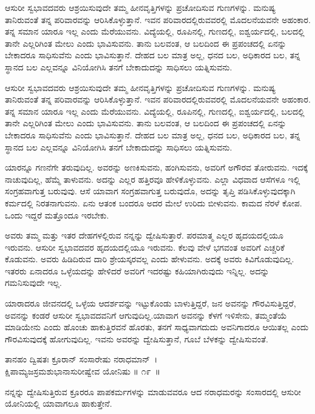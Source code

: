 ಆಸುರೀ ಸ್ವಭಾವದವರು ಆಶ್ರಯಿಸುವುದೇ ತಮ್ಮ ಹೀನವೃತ್ತಿಗಳನ್ನು ಪ್ರಚೋದಿಸುವ ಗುಣಗಳನ್ನು. ಮನುಷ್ಯ ತಾನಿರುವಂತೆ ತನ್ನ ಪರಿವಾರವನ್ನು ಆರಿಸಿಕೊಳ್ಳುತ್ತಾನೆ. ಇವನ ಪರಿವಾರ\-ದಲ್ಲಿರುವವರಲ್ಲಿ ಮೊದಲನೆಯವನೇ ಅಹಂಕಾರ. ತನ್ನ ಸಮಾನ ಯಾರೂ ಇಲ್ಲ ಎಂದು ಮೆರೆಯುವನು. ವಿದ್ಯೆಯಲ್ಲಿ, ರೂಪಿನಲ್ಲಿ, ಗುಣದಲ್ಲಿ, ಐಶ್ವರ್ಯದಲ್ಲಿ, ಬಲದಲ್ಲಿ ತಾನೇ ಎಲ್ಲರಿಗಿಂತ ಮೇಲು ಎಂದು ಭಾವಿಸುವನು. ತಾನು ಬಲವಂತ, ಆ ಬಲದಿಂದ ಈ ಪ್ರಪಂಚದಲ್ಲಿ ಏನನ್ನು ಬೇಕಾದರೂ ಸಾಧಿಸುವೆನು ಎಂದು ಭಾವಿಸುತ್ತಾನೆ. ದೇಹದ ಬಲ ಮಾತ್ರ ಅಲ್ಲ, ಧನದ ಬಲ, ಅಧಿಕಾರದ ಬಲ, ತನ್ನ ಸ್ಥಾನದ ಬಲ ಎಲ್ಲವನ್ನೂ ವಿನಿಯೋಗಿಸಿ ತನಗೆ ಬೇಕಾದುದನ್ನು ಸಾಧಿಸಲು ಯತ್ನಿಸುವನು.

ಆಸುರೀ ಸ್ವಭಾವದವರು ಆಶ್ರಯಿಸುವುದೇ ತಮ್ಮ ಹೀನವೃತ್ತಿಗಳನ್ನು ಪ್ರಚೋದಿಸುವ ಗುಣಗಳನ್ನು. ಮನುಷ್ಯ ತಾನಿರುವಂತೆ ತನ್ನ ಪರಿವಾರವನ್ನು ಆರಿಸಿಕೊಳ್ಳುತ್ತಾನೆ. ಇವನ ಪರಿವಾರ\-ದಲ್ಲಿರುವವರಲ್ಲಿ ಮೊದಲನೆಯವನೇ ಅಹಂಕಾರ. ತನ್ನ ಸಮಾನ ಯಾರೂ ಇಲ್ಲ ಎಂದು ಮೆರೆಯುವನು. ವಿದ್ಯೆಯಲ್ಲಿ, ರೂಪಿನಲ್ಲಿ, ಗುಣದಲ್ಲಿ, ಐಶ್ವರ್ಯದಲ್ಲಿ, ಬಲದಲ್ಲಿ ತಾನೇ ಎಲ್ಲರಿಗಿಂತ ಮೇಲು ಎಂದು ಭಾವಿಸುವನು. ತಾನು ಬಲವಂತ, ಆ ಬಲದಿಂದ ಈ ಪ್ರಪಂಚದಲ್ಲಿ ಏನನ್ನು ಬೇಕಾದರೂ ಸಾಧಿಸುವೆನು ಎಂದು ಭಾವಿಸುತ್ತಾನೆ. ದೇಹದ ಬಲ ಮಾತ್ರ ಅಲ್ಲ, ಧನದ ಬಲ, ಅಧಿಕಾರದ ಬಲ, ತನ್ನ ಸ್ಥಾನದ ಬಲ ಎಲ್ಲವನ್ನೂ ವಿನಿಯೋಗಿಸಿ ತನಗೆ ಬೇಕಾದುದನ್ನು ಸಾಧಿಸಲು ಯತ್ನಿಸುವನು.

ಯಾರನ್ನೂ ಗಣನೆಗೇ ತರುವುದಿಲ್ಲ. ಅವರನ್ನು ಅಣಕಿಸುವನು, ಹಂಗಿಸುವನು, ಅವರಿಗೆ ಅಗೌರವ ತೋರುವನು. ಇದಕ್ಕೆ ನಾಚುವುದಿಲ್ಲ, ಹೆಮ್ಮೆ ತಾಳುವನು. ಅದನ್ನು ಎಲ್ಲರ ಹತ್ತಿರವೂ ಹೇಳಿಕೊಳ್ಳುವನು. ಎಲ್ಲಾ ವಿಧವಾದ ಆಸೆಗಳೂ ಇಲ್ಲಿ ಸಂಗ್ರಹವಾಗುತ್ತ ಬರುವುವು. ಆಸೆ ಯಾವಾಗ ಸಂಗ್ರಹವಾಗುತ್ತ ಬರುವುದೊ, ಅದನ್ನು ತೃಪ್ತಿ ಪಡಿಸಿಕೊಳ್ಳುವುದಕ್ಕಾಗಿ ಕರ್ಮದಲ್ಲಿ ನಿರತನಾಗುವನು. ಏನು ಆತಂಕ ಬಂದರೂ ಅದರ ಮೇಲೆ ಉರಿದು ಬೀಳುವನು. ಕಾಮದ ನೆರಳೆ ಕೋಪ. ಒಂದು ಇದ್ದರೆ ಮತ್ತೊಂದೂ ಇರಬೇಕು.

ಅವರು ತಮ್ಮ ಮತ್ತು ಇತರ ದೇಹಗಳಲ್ಲಿರುವ ನನ್ನನ್ನು ದ್ವೇಷಿಸುತ್ತಾರೆ. ಪರಮಾತ್ಮ ಎಲ್ಲರ ಹೃದಯದಲ್ಲಿಯೂ ಇರುವನು. ಆಸುರೀ ಸ್ವಭಾವದವರ ಹೃದಯದಲ್ಲಿಯೂ ಇರುವನು. ಕೆಲವು ವೇಳೆ ಭಗವಂತ ಅವರಿಗೆ ಎಚ್ಚರಿಕೆ ಕೊಡುವನು. ಅವರು ಹಿಡಿದಿರುವ ದಾರಿ ಶ್ರೇಯಸ್ಕರವಲ್ಲ ಎಂದು ಹೇಳುವನು. ಅದಕ್ಕೆ ಅವರು ಕಿವಿಗೊಡುವುದಿಲ್ಲ. ಇತರರು ಏನಾದರೂ ಒಳ್ಳೆಯದನ್ನು ಹೇಳಿದರೆ ಅವರಿಗೆ ಇದರಷ್ಟು ಕಹಿಯಾಗಿರುವುದು ಇನ್ನಿಲ್ಲ. ಅದನ್ನು ಗಮನಿಸುವುದೇ ಇಲ್ಲ.

ಯಾರಾದರೂ ಜೀವನದಲ್ಲಿ ಒಳ್ಳೆಯ ಆದರ್ಶವನ್ನು ಇಟ್ಟುಕೊಂಡು ಬಾಳುತ್ತಿದ್ದರೆ, ಜನ ಅವನನ್ನು ಗೌರವಿಸುತ್ತಿದ್ದರೆ, ಅವನನ್ನು ಕಂಡರೆ ಆಸುರೀ ಸ್ವಭಾವದವನಿಗೆ ಆಗುವುದಿಲ್ಲ.\break ಯಾವಾಗ ಅವನನ್ನು ಕೆಳಗೆ ಇಳಿಸೇನು, ತಮ್ಮಂತೆಯೆ ಮಾಡಿಯೇನು ಎಂದು ಹೊಂಚು ಹಾಕು\-ತ್ತಿರವನೆ ಹೊರತು, ತನಗೆ ಸಾಧ್ಯವಾಗದುದು ಅವನಿಗಾದರೂ ಆಯಿತಲ್ಲ ಎಂದು ಗೌರವಿಸುವುದಕ್ಕೆ ಹೋಗುವುದಿಲ್ಲ. ಇವನು ಅವರನ್ನು ದ್ವೇಷಿಸುತ್ತಾನೆ, ಗೂಬೆ ಬೆಳಕನ್ನು ದ್ವೇಷಿಸುವಂತೆ.

\begin{shloka}
ತಾನಹಂ ದ್ವಿಷತಃ ಕ್ರೂರಾನ್ ಸಂಸಾರೇಷು ನರಾಧಮಾನ್~।\\ಕ್ಷಿಪಾಮ್ಯಜಸ್ರಮಶುಭಾನಾಸುರೀಷ್ವೇವ ಯೋನಿಷು \hfill॥ ೧೯~॥
\end{shloka}

\begin{artha}
ನನ್ನನ್ನು ದ್ವೇಷಿಸುತ್ತಿರುವ ಕ್ರೂರರೂ ಪಾಪಕರ್ಮಗಳನ್ನು ಮಾಡುವವರೂ ಆದ ನರಾಧಮರನ್ನು ಸಂಸಾರದಲ್ಲಿ ಆಸುರೀ ಯೋನಿಯಲ್ಲಿ ಯಾವಾಗಲೂ ಹಾಕುತ್ತೇನೆ.
\end{artha}

